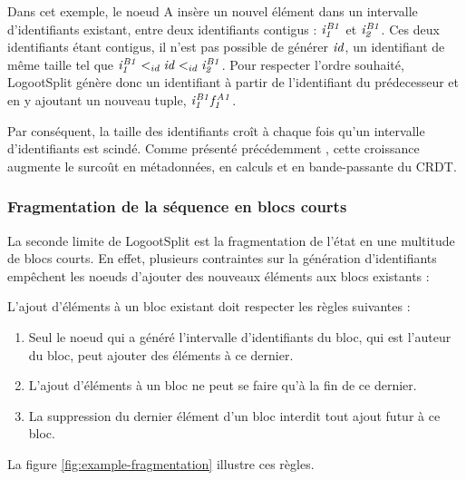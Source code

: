 Dans cet exemple, le noeud A insère un nouvel élément dans un intervalle d'identifiants existant, \ie entre deux identifiants contigus : $\mathit{i}^{\mathit{B1}}_{\mathit{1}}$ et $\mathit{i}^{\mathit{B1}}_{\mathit{2}}$.
Ces deux identifiants étant contigus, il n'est pas possible de générer $\mathit{id}$, un identifiant de même taille tel que $\mathit{i}^{\mathit{B1}}_{\mathit{1}} <_{id} \mathit{id} <_{id} \mathit{i}^{\mathit{B1}}_{\mathit{2}}$.
Pour respecter l'ordre souhaité, LogootSplit génère donc un identifiant à partir de l'identifiant du prédecesseur et en y ajoutant un nouveau tuple, \eg $\mathit{i}^{\mathit{B1}}_{\mathit{1}}\mathit{f}^{\mathit{A1}}_{\mathit{1}}$.

Par conséquent, la taille des identifiants croît à chaque fois qu'un intervalle d'identifiants est scindé.
Comme présenté précédemment , cette croissance augmente le surcoût en métadonnées, en calculs et en bande-passante du \ac{CRDT}.

\subsubsection{Fragmentation de la séquence en blocs courts}

La seconde limite de LogootSplit est la fragmentation de l'état en une multitude de blocs courts.
En effet, plusieurs contraintes sur la génération d'identifiants empêchent les noeuds d'ajouter des nouveaux éléments aux blocs existants :

\begin{definition}
  L'ajout d'éléments à un bloc existant doit respecter les règles suivantes :
  \begin{enumerate}
    \item Seul le noeud qui a généré l'intervalle d'identifiants du bloc, \ie qui est l'auteur du bloc, peut ajouter des éléments à ce dernier.
    \item L'ajout d'éléments à un bloc ne peut se faire qu'à la fin de ce dernier.
    \item La suppression du dernier élément d'un bloc interdit tout ajout futur à ce bloc.
  \end{enumerate}
\end{definition}

La figure \autoref{fig:example-fragmentation} illustre ces règles.

